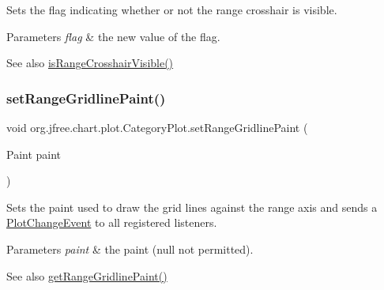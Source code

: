 Sets the flag indicating whether or not the range crosshair is visible.


\begin{DoxyParams}{Parameters}
{\em flag} & the new value of the flag.\\
\hline
\end{DoxyParams}
\begin{DoxySeeAlso}{See also}
\mbox{\hyperlink{classorg_1_1jfree_1_1chart_1_1plot_1_1_category_plot_ab7277c96161f03a087953b3313b39c47}{is\+Range\+Crosshair\+Visible()}} 
\end{DoxySeeAlso}
\mbox{\label{classorg_1_1jfree_1_1chart_1_1plot_1_1_category_plot_a8bbe8561afac2e8f929844c173f9d93b}} 
\subsubsection{\texorpdfstring{set\+Range\+Gridline\+Paint()}{setRangeGridlinePaint()}}
{\footnotesize\ttfamily void org.\+jfree.\+chart.\+plot.\+Category\+Plot.\+set\+Range\+Gridline\+Paint (\begin{DoxyParamCaption}\item[{Paint}]{paint }\end{DoxyParamCaption})}

Sets the paint used to draw the grid lines against the range axis and sends a \mbox{\hyperlink{}{Plot\+Change\+Event}} to all registered listeners.


\begin{DoxyParams}{Parameters}
{\em paint} & the paint ({\ttfamily null} not permitted).\\
\hline
\end{DoxyParams}
\begin{DoxySeeAlso}{See also}
\mbox{\hyperlink{classorg_1_1jfree_1_1chart_1_1plot_1_1_category_plot_abb4101febf21c1537aecd57c3a524250}{get\+Range\+Gridline\+Paint()}} 
\end{DoxySeeAlso}
\mbox{\label{classorg_1_1jfree_1_1chart_1_1plot_1_1_category_plot_a108f18f155e590c12c0432d06eeab155}} 
